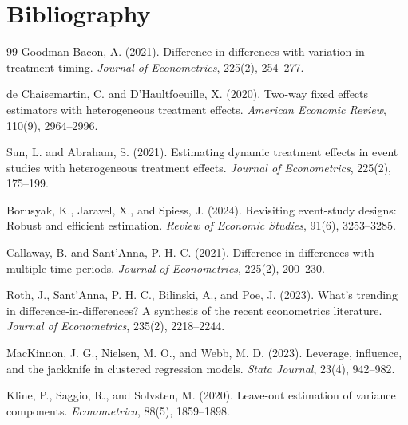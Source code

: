 \documentclass[11pt]{article}
\theoremstyle{definition}
\theoremstyle{plain}
\theoremstyle{remark}
\begin{document}
\section*{Bibliography}
\begin{thebibliography}{99}
Goodman-Bacon, A. (2021).
Difference-in-differences with variation in treatment timing.
\emph{Journal of Econometrics}, 225(2), 254--277.

de Chaisemartin, C. and D'Haultfoeuille, X. (2020).
Two-way fixed effects estimators with heterogeneous treatment effects.
\emph{American Economic Review}, 110(9), 2964--2996.

Sun, L. and Abraham, S. (2021).
Estimating dynamic treatment effects in event studies with heterogeneous treatment effects.
\emph{Journal of Econometrics}, 225(2), 175--199.

Borusyak, K., Jaravel, X., and Spiess, J. (2024).
Revisiting event-study designs: Robust and efficient estimation.
\emph{Review of Economic Studies}, 91(6), 3253--3285.

Callaway, B. and Sant'Anna, P. H. C. (2021).
Difference-in-differences with multiple time periods.
\emph{Journal of Econometrics}, 225(2), 200--230.

Roth, J., Sant'Anna, P. H. C., Bilinski, A., and Poe, J. (2023).
What's trending in difference-in-differences? A synthesis of the recent econometrics literature.
\emph{Journal of Econometrics}, 235(2), 2218--2244.

MacKinnon, J. G., Nielsen, M. O., and Webb, M. D. (2023).
Leverage, influence, and the jackknife in clustered regression models.
\emph{Stata Journal}, 23(4), 942--982.

Kline, P., Saggio, R., and Solvsten, M. (2020).
Leave-out estimation of variance components.
\emph{Econometrica}, 88(5), 1859--1898.
\end{thebibliography}
\end{document}
